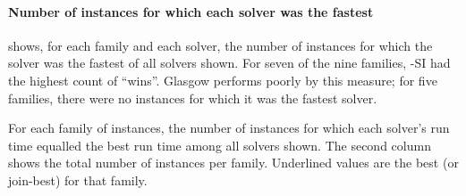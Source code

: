 \paragraph*{Number of instances for which each solver was the fastest}
 shows, for each family and each solver,
the number of instances for which the solver was the fastest of all solvers
shown.  For seven of the nine families, \McSplit-SI had the highest count
of ``wins''.  Glasgow performs poorly by this measure; for five families,
there were no instances for which it was the fastest solver.

\begin{table}[htb]
\centering
\footnotesize
    
\caption{For each family of instances, the number of instances for which each solver's
    run time equalled the best run time among all solvers shown.  The second
    column shows the total number of instances per family.  Underlined values
    are the best (or join-best) for that family.}
\label{tab:si-decision-winner-counts}
\end{table}

